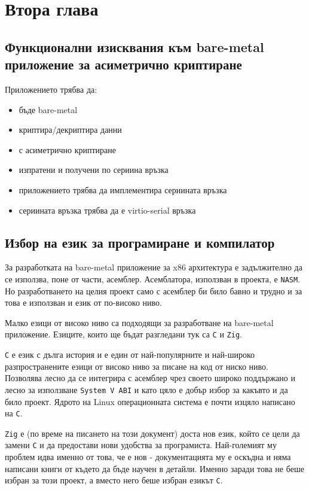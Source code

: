 \chapter{Втора глава} %
\section{Функционални изисквания към bare-metal приложение за асиметрично криптиране}
Приложението трябва да:
\begin{itemize}
  \item бъде bare-metal
  \item криптира/декриптира данни
  \item с асиметрично криптиране
  \item изпратени и получени по сериина връзка
  \item приложението трябва да имплементира сериината връзка
  \item сериината връзка трябва да е virtio-serial връзка
\end{itemize}

\section{Избор на език за програмиране и компилатор}
За разработката на bare-metal приложение за x86 архитектура е задължително да се използва, поне от части, асемблер. Асемблатора, използван в проекта, е {\tt NASM}. Но разработването на целия проект само с асемблер би било бавно и трудно и за това е използван и език от по-високо ниво.

Малко езици от високо ниво са подходящи за разработване на bare-metal приложение. Езиците, които ще бъдат разгледани тук са {\tt C} и {\tt Zig}.

{\tt C} е език с дълга история и е един от най-популярните и най-широко разпространените езици от високо ниво за писане на код от ниско ниво. Позволява лесно да се интегрира с асемблер чрез своето широко поддържано и лесно за използване {\tt System V ABI}\parencite{sysvabi} и като цяло е добър избор за какъвто и да било проект. Ядрото на Linux операционната система е почти изцяло написано на {\tt C}.

{\tt Zig} е (по време на писането на този документ) доста нов език, който се цели да замени {\tt C} и да предостави нови удобства за програмиста\parencite{whyzig}. Най-големият му проблем идва именно от това, че е нов - документацията му е оскъдна и няма написани книги от където да бъде научен в детайли. Именно заради това не беше избран за този проект, а вместо него беше избран езикът {\tt C}.

